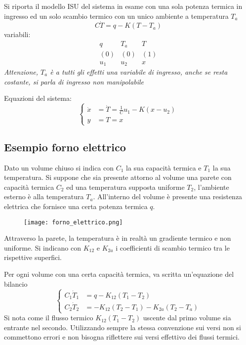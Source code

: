 Si riporta il modello ISU del sistema in esame con una sola potenza termica in
ingresso ed un solo scambio termico con un unico ambiente
 a temperatura $T_a$
$$
C\dot{T} = q -K(T-T_a)
$$
variabili:
$$\begin{matrix}
q & T_a & T \\
(0) & (0) & (1) \\
u_1 & u_2 & x
\end{matrix}
$$
\emph{Attenzione, $T_a$ è a tutti gli effetti una variabile di ingresso, anche
se resta costante, si parla di ingresso non manipolabile}

Equazioni del sistema:
$$\left\{\begin{aligned}
\dot{x} &=  \dot{T} = \frac{1}{C}u_1-K(x-u_2) \\
y &= T = x
\end{aligned}\right.$$

\subsection{Esempio forno elettrico}
Dato un volume chiuso si indica con $C_1$ la sua capacità termica e $T_1$ la
sua temperatura.
Si suppone che sia presente attorno al volume una parete con capacità termica
$C_2$ ed una temperatura supposta uniforme $T_2$, l'ambiente esterno è alla
temperatura $T_a$.
All'interno del volume è presente una resistenza elettrica che fornisce una
certa potenza termica $q$.

\begin{figure}[h]
 \centering
 \texttt{[image: forno\_elettrico.png]}
 \label{Fig.:forno_elettrico}
\end{figure}

Attraverso la parete, la temperatura è in realtà un gradiente termico e non
uniforme.
Si indicano con $K_{12}$ e $K_{2a}$ i coefficienti di scambio termico tra le
rispettive superfici.

Per ogni volume con una certa capacità termica, va scritta un'equazione del
bilancio
$$\left\{\begin{aligned}
C_1\dot T_1 &= q - K_{12}(T_1-T_2)\\
C_2\dot{T}_2 &= -K_{12}(T_2-T_1) - K_{2a}(T_2-T_a)
\end{aligned}\right.$$
Si nota come il flusso termico $K_{12}(T_1-T_2)$ uscente dal primo volume sia
entrante nel secondo.
Utilizzando sempre la stessa convenzione sui versi non si commettono errori e
non bisogna riflettere sui versi effettivo dei flussi termici.


